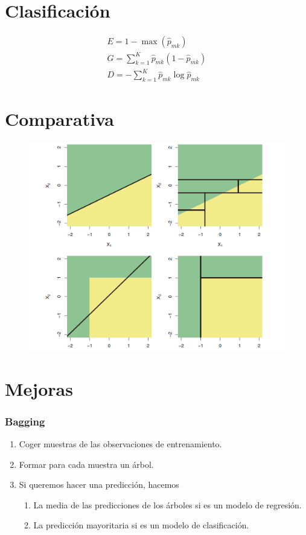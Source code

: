 \documentclass{beamer}
\theoremstyle{definition}
\begin{document}
\section{Clasificación}

\begin{frame}
\begin{gather*}
 E = 1 - \max(\hat{p}_{mk}) \\ 
 G = \sum_{k=1}^K \hat{p}_{mk}(1-\hat{p}_{mk})\\
  D = -\sum_{k=1}^K \hat{p}_{mk} \log \hat{p}_{mk}
\end{gather*}
\end{frame}

\section{Comparativa}
\begin{frame}
\begin{figure}[h!]
%
\includegraphics[scale=0.4]{svg-inkscape/compara.png}
\end{figure}
\end{frame}
\section{Mejoras}
\begin{frame}
\frametitle{Bagging}
\begin{enumerate}
	\item<1-> Coger muestras de las observaciones de entrenamiento.
	\item<2-> Formar para cada muestra un árbol.
	\item<3-> Si queremos hacer una predicción, hacemos 
	\begin{enumerate}
		\item La media de las predicciones de los árboles si es un modelo de regresión.
		\item La predicción mayoritaria si es un modelo de clasificación.
	\end{enumerate}
\end{enumerate}
\end{frame}
\end{document}
